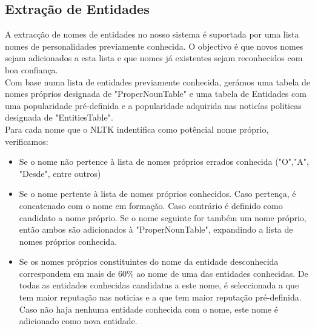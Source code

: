 \subsection{Extração de Entidades}
\label{sec:entity_extraction}
\hspace{15pt}A extracção de nomes de entidades no nosso sistema é suportada por uma lista nomes de personalidades previamente conhecida. O objectivo é que novos nomes sejam adicionados a esta lista e que nomes já existentes sejam reconhecidos com boa confiança.\\
Com base numa lista de entidades previamente conhecida, gerámos uma tabela de nomes próprios designada de "ProperNounTable" e uma tabela de Entidades com uma popularidade pré-definida e a popularidade adquirida nas noticías politicas designada de "EntitiesTable".\\
Para cada nome que o NLTK indentifica como potêncial nome próprio, verificamos:

\begin{itemize}
\item Se o nome não pertence à lista de nomes próprios errados conhecida ("O","A", "Desde", entre outros)

\item Se o nome pertente à lista de nomes próprios conhecidos. Caso pertença, é concatenado com o nome em formação. Caso contrário é definido como candidato a nome próprio. Se o nome seguinte for também um nome próprio, então ambos são adicionados à "ProperNounTable", expandindo a lista de nomes próprios conhecida. 

\item Se os nomes próprios constituintes do nome da entidade desconhecida correspondem em mais de 60\% ao nome de uma das entidades conhecidas. De todas as entidades conhecidas candidatas a este nome, é seleccionada a que tem maior reputação nas noticias e a que tem maior reputação pré-definida. Caso não haja nenhuma entidade conhecida com o nome, este nome é adicionado como nova entidade.
\end{itemize}

